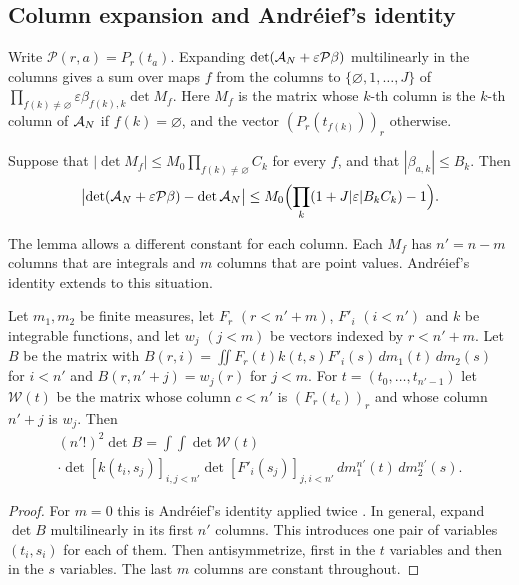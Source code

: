 \subsection{Column expansion and Andr\'eief's identity}\label{ssec:andreief}
Write $\mathcal P(r,a)=P_r(t_a)$. Expanding $\det(\mathcal A_N+\varepsilon\mathcal P\beta)$ multilinearly in the
columns gives a sum over maps $f$ from the columns to $\{\varnothing,1,\ldots,J\}$ of
$\prod_{f(k)\ne\varnothing}\varepsilon\beta_{f(k),k}\det M_f$. Here $M_f$ is the matrix whose $k$-th column is
the $k$-th column of $\mathcal A_N$ if $f(k)=\varnothing$, and the vector $(P_r(t_{f(k)}))_r$ otherwise.

\begin{lemma}\label{lem:expansion}
Suppose that $|\det M_f|\le M_0\prod_{f(k)\ne\varnothing}C_k$ for every $f$, and that $|\beta_{a,k}|\le B_k$.
Then
\[
 \bigl|\det(\mathcal A_N+\varepsilon\mathcal P\beta)-\det\mathcal A_N\bigr|\le M_0\Bigl(\prod_k(1+J|\varepsilon|B_kC_k)-1\Bigr).
\]
\end{lemma}

The lemma allows a different constant for each column. Each $M_f$ has $n'=n-m$ columns that are integrals
and $m$ columns that are point values. Andr\'eief's identity extends to this situation.

\begin{lemma}\label{lem:andreief}
Let $m_1,m_2$ be finite measures, let $F_r$ $(r<n'+m)$, $F'_i$ $(i<n')$ and $k$ be integrable functions, and let
$w_j$ $(j<m)$ be vectors indexed by $r<n'+m$. Let $B$ be the matrix with
$B(r,i)=\iint F_r(t)k(t,s)F'_i(s)\,dm_1(t)\,dm_2(s)$ for $i<n'$ and $B(r,n'+j)=w_j(r)$ for $j<m$. For
$t=(t_0,\ldots,t_{n'-1})$ let $\mathcal W(t)$ be the matrix whose column $c<n'$ is $(F_r(t_c))_r$ and whose column $n'+j$ is
$w_j$. Then
\begin{multline*}
 (n'!)^2\det B=\int\!\!\int\det\mathcal W(t)\\
 \cdot\det[k(t_i,s_j)]_{i,j<n'}\det[F'_i(s_j)]_{j,i<n'}\,dm_1^{n'}(t)\,dm_2^{n'}(s).
\end{multline*}
\end{lemma}

\begin{proof}
For $m=0$ this is Andr\'eief's identity applied twice \cite{Forrester2018Andreief}. In general, expand
$\det B$ multilinearly in its first $n'$ columns. This introduces one pair of variables $(t_i,s_i)$ for each
of them. Then antisymmetrize, first in the $t$ variables and then in the $s$ variables. The last $m$ columns
are constant throughout.
\end{proof}

